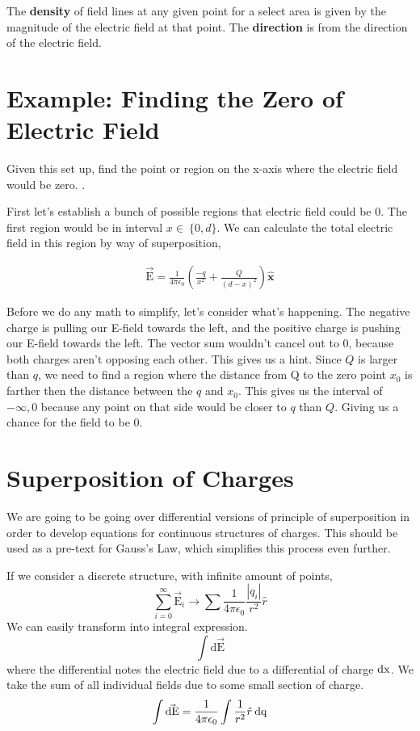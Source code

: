 
The \textbf{density} of field lines at any given point for a select area is given by the magnitude of the electric field at that point. The \textbf{direction} is from the direction of the electric field.  

\section{Example: Finding the Zero of Electric Field}
Given this set up, find the point or region on the x-axis where the electric field would be zero.
.

First let's establish a bunch of possible regions that electric field could be 0. The first region would be in interval $x \in \: \{0, d\}$. We can calculate the total electric field in this region by way of superposition,

\begin{align*}
	\vec{\mathrm{E}} = \frac{1}{4\pi\epsilon_0}(\frac{-q}{x^2} + \frac{Q}{(d-x)^2}) \hat{\mathbf{x}}
\end{align*}

Before we do any math to simplify, let's consider what's happening. The negative charge is pulling our E-field towards the left, and the positive charge is pushing our E-field towards the left. The vector sum wouldn't cancel out to 0, because both charges aren't opposing each other. This gives us a hint. Since $Q$ is larger than $q$, we need to find a region where the distance from Q to the zero point $x_0$ is farther then the distance between the $q$ and $x_0$. This gives us the interval of ${-\infty, 0}$ because any point on that side would be closer to $q$ than $Q$. Giving us a chance for the field to be 0.

\section{Superposition of Charges}
We are going to be going over differential versions of principle of superposition in order to develop equations for continuous structures of charges. This should be used as a pre-text for Gauss's Law, which simplifies this process even further. 

If we consider a discrete structure, with infinite amount of points, 
\begin{equation*}
	\sum_{i=0}^\infty \vec{\mathrm{E}}_i \to \sum \frac{1}{4\pi\epsilon_0}\frac{|q_i|}{r^2}\hat{r}
\end{equation*} 
We can easily transform into integral expression.
\begin{equation*}
	\int \mathrm{d}\vec{\mathrm{E}}
\end{equation*}
where the differential notes the electric field due to a differential of charge $\mathrm{dx}$. We take the sum of all individual fields due to some small section of charge. 
\begin{equation*}
	\int \vec{\mathrm{dE}} = \frac{1}{4\pi\epsilon_0}\int \frac{1}{r^2}\hat{r} \:\mathrm{dq}
\end{equation*}

